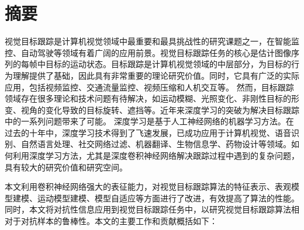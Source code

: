 \maketitle%
\MAKETITLE%
\makedeclaration%
\intobmk\chapter*{摘\quad 要}%
\setcounter{page}{1}%

视觉目标跟踪是计算机视觉领域中最重要和最具挑战性的研究课题之一，在智能监控、自动驾驶等领域有着广阔的应用前景。视觉目标跟踪任务的核心是估计图像序列的每帧中目标的运动状态。目标跟踪是计算机视觉领域的中层部分，为目标的行为理解提供了基础，因此具有非常重要的理论研究价值。同时，它具有广泛的实际应用，包括视频监控、交通流量监控、视频压缩和人机交互等。
然而，目标跟踪领域存在很多理论和技术问题有待解决，如运动模糊、光照变化、非刚性目标的形变、视角的变化导致的目标旋转、遮挡等。近年来深度学习的突破为解决目标跟踪中的一系列问题带来了可能。
深度学习是基于人工神经网络的机器学习方法。在过去的十年中，深度学习技术得到了飞速发展，已成功应用于计算机视觉、语音识别、自然语言处理、社交网络过滤、机器翻译、生物信息学、药物设计等领域。如何利用深度学习方法，尤其是深度卷积神经网络解决跟踪过程中遇到的复杂问题，具有较大的研究价值和研究空间。

本文利用卷积神经网络强大的表征能力，对视觉目标跟踪算法的特征表示、表观模型建模、运动模型建模、模型自适应等方面进行了改进，有效提高了算法的性能。同时，本文将对抗性信息应用到视觉目标跟踪任务中，以研究视觉目标跟踪算法相对于对抗样本的鲁棒性。本文的主要工作和贡献概括如下：

